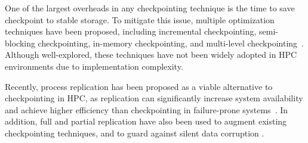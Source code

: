 One of the largest overheads in any checkpointing technique is the time to save checkpoint
to stable storage. %
To mitigate this issue, multiple optimization techniques have been proposed, including incremental checkpointing, semi-blocking checkpointing, in-memory checkpointing, and multi-level checkpointing~\cite{Agarwal:04:Adaptive,plank_ftcs_1994,elnozahy_1992_manetho,zheng2004ftc,ni2012hiding,Moody:10:SCR,hakkarine_2013}.
 Although well-explored, these techniques have not been widely adopted
in HPC environments due to implementation complexity. 

Recently, process replication has been proposed as a viable alternative to checkpointing in HPC, as replication can significantly increase system availability and achieve higher efficiency than checkpointing in failure-prone systems~\cite{riesen_sandia_2010,cappello2009fault}.
In addition, full and partial
replication have also been used to augment existing checkpointing techniques, and to guard
against silent data corruption \cite{stearly_2012_partial,elliott_2012_cpr,ni_2013_acr,fiala_2012_sdc}.



